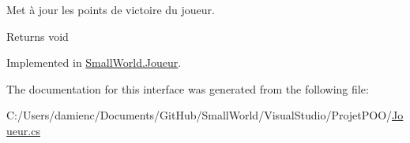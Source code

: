 Met à jour les points de victoire du joueur. 

\begin{DoxyReturn}{Returns}
void 
\end{DoxyReturn}


Implemented in \hyperlink{class_small_world_1_1_joueur_aaa0f98cea097955f2c75e978433a7c68}{Small\-World.\-Joueur}.



The documentation for this interface was generated from the following file\-:\begin{DoxyCompactItemize}
\item 
C\-:/\-Users/damienc/\-Documents/\-Git\-Hub/\-Small\-World/\-Visual\-Studio/\-Projet\-P\-O\-O/\hyperlink{_joueur_8cs}{Joueur.\-cs}\end{DoxyCompactItemize}

